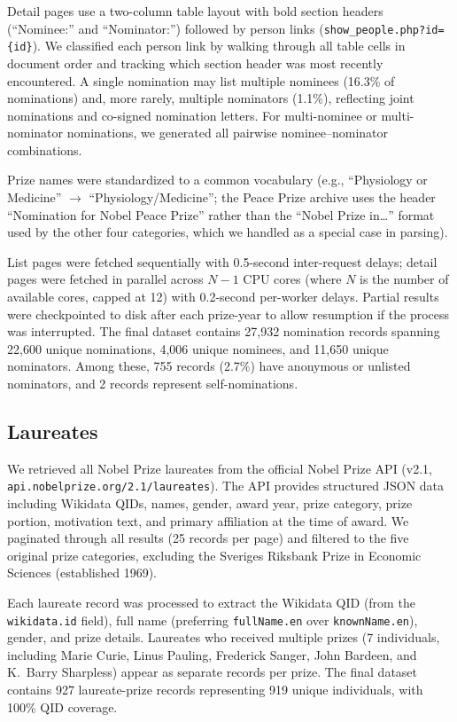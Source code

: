Detail pages use a two-column table layout with bold section headers
(``Nominee:'' and ``Nominator:'') followed by person links
(\texttt{show\_people.php?id=\{id\}}). We classified each person link
by walking through all table cells in document order and tracking which
section header was most recently encountered. A single nomination may list
multiple nominees (16.3\% of nominations) and, more rarely, multiple
nominators (1.1\%), reflecting joint nominations and co-signed nomination
letters. For multi-nominee or multi-nominator nominations, we generated
all pairwise nominee--nominator combinations.

Prize names were standardized to a common vocabulary (e.g., ``Physiology
or Medicine'' $\to$ ``Physiology/Medicine''; the Peace Prize archive uses
the header ``Nomination for Nobel Peace Prize'' rather than the
``Nobel Prize in\ldots'' format used by the other four categories, which we
handled as a special case in parsing).

List pages were fetched sequentially with 0.5-second inter-request delays;
detail pages were fetched in parallel across $N-1$ CPU cores (where $N$ is
the number of available cores, capped at 12) with 0.2-second per-worker
delays. Partial results were checkpointed to disk after each prize-year to
allow resumption if the process was interrupted. The final dataset contains
27{,}932 nomination records spanning 22{,}600 unique nominations, 4{,}006
unique nominees, and 11{,}650 unique nominators. Among these, 755 records
(2.7\%) have anonymous or unlisted nominators, and 2 records represent
self-nominations.

\subsection{Laureates}\label{sec:laureates}

We retrieved all Nobel Prize laureates from the official Nobel Prize API
(v2.1, \texttt{api.nobelprize.org/2.1/laureates}). The API provides
structured JSON data including Wikidata QIDs, names, gender, award year,
prize category, prize portion, motivation text, and primary affiliation at
the time of award. We paginated through all results (25 records per page)
and filtered to the five original prize categories, excluding the Sveriges
Riksbank Prize in Economic Sciences (established 1969).

Each laureate record was processed to extract the Wikidata QID (from the
\texttt{wikidata.id} field), full name (preferring \texttt{fullName.en}
over \texttt{knownName.en}), gender, and prize details. Laureates who
received multiple prizes (7 individuals, including Marie Curie, Linus
Pauling, Frederick Sanger, John Bardeen, and K.~Barry Sharpless) appear
as separate records per prize. The final dataset contains 927
laureate-prize records representing 919 unique individuals, with 100\%
QID coverage.

